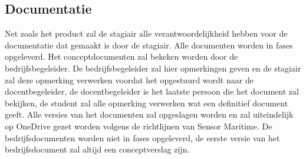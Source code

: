 \subsection{Documentatie}
Net zoals het product zal de stagiair alle verantwoordelijkheid hebben voor de documentatie dat gemaakt is door de stagiair. Alle documenten worden in fases opgeleverd. Het conceptdocumenten zal bekeken worden door de bedrijfsbegeleider. De bedrijfsbegeleider zal hier opmerkingen geven en de stagiair zal deze opmerking verwerken voordat het opgestuurd wordt naar de docentbegeleider, de docentbegeleider is het laatste persoon die het document zal bekijken, de student zal alle opmerking verwerken wat een definitief document geeft. Alle versies van het documenten zal opgeslagen worden en zal uiteindelijk op OneDrive gezet worden volgens de richtlijnen van Sensor Maritime. De bedrijfsdocumenten worden niet in fases opgeleverd, de eerste versie van het bedrijfsdocument zal altijd een conceptverslag zijn.